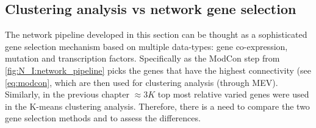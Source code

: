 



\subsection{Clustering analysis vs network gene selection} \label{s:N_I:cs_vs_gene_sel}

The network pipeline developed in this section can be thought as a sophisticated gene selection mechanism based on multiple data-types: gene co-expression, mutation and transcription factors. Specifically as the ModCon step from  \cref{fig:N_I:network_pipeline} picks the genes that have the highest connectivity (see \cref{eq:modcon}, which are then used for clustering analysis (through MEV). Similarly, in the previous chapter $\approx3K$ top most relative varied genes were used in the K-means clustering analysis. Therefore, there is a need to compare the two gene selection methods and to assess the differences.

